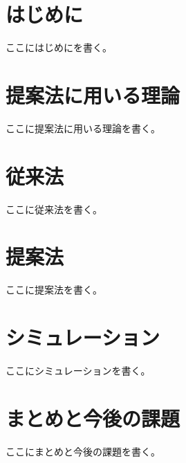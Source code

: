 \documentclass[10pt,a4paper,oneside,twocolumn,fleqn,dvipdfmx]{jsarticle}
\begin{document}

\section{はじめに}
ここにはじめにを書く。

\section{提案法に用いる理論}
ここに提案法に用いる理論を書く。

\section{従来法}
ここに従来法を書く。

\section{提案法}
ここに提案法を書く。

\section{シミュレーション}
ここにシミュレーションを書く。

\section{まとめと今後の課題}
ここにまとめと今後の課題を書く。

\small


\normalsize
\end{document}
